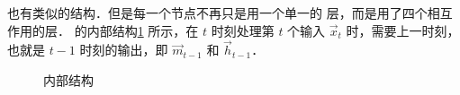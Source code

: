 \lstm{} 也有类似的结构．但是每一个节点不再只是用一个单一的  层，而是用了四个相互作用的层．\lstm{} 的内部结构\cref{fig:Inner Structure of LSTM} 所示，在 $t$ 时刻处理第 $t$ 个输入 $\vec{x}_t$ 时，需要上一时刻，也就是 $t-1$ 时刻的输出，即 $\vec{m}_{t-1}$ 和 $\vec{h}_{t-1}$．%
%
\begin{figure}[!htb]
  \centering
  \scalebox{0.7}{}
  \caption{\lstm{} 内部结构}
  \label{fig:Inner Structure of LSTM}
\end{figure}%
%


